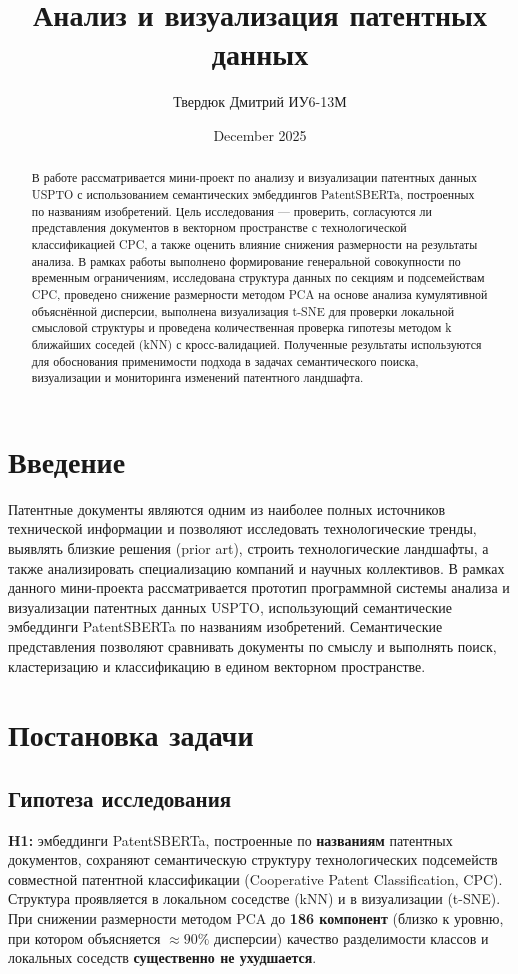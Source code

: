 \documentclass{article}
\title{Анализ и визуализация патентных данных}
\author{Твердюк Дмитрий ИУ6-13М}
\date{December 2025}
\begin{document}
\maketitle

\begin{abstract}
В работе рассматривается мини-проект по анализу и визуализации патентных данных USPTO с использованием семантических эмбеддингов PatentSBERTa, построенных по названиям изобретений. Цель исследования --- проверить, согласуются ли представления документов в векторном пространстве с технологической классификацией CPC, а также оценить влияние снижения размерности на результаты анализа. В рамках работы выполнено формирование генеральной совокупности по временным ограничениям, исследована структура данных по секциям и подсемействам CPC, проведено снижение размерности методом PCA на основе анализа кумулятивной объяснённой дисперсии, выполнена визуализация t-SNE для проверки локальной смысловой структуры и проведена количественная проверка гипотезы методом k ближайших соседей (kNN) с кросс-валидацией. Полученные результаты используются для обоснования применимости подхода в задачах семантического поиска, визуализации и мониторинга изменений патентного ландшафта.
\end{abstract}

\tableofcontents
\newpage

\section{Введение}
Патентные документы являются одним из наиболее полных источников технической информации и позволяют исследовать технологические тренды, выявлять близкие решения (prior art), строить технологические ландшафты, а также анализировать специализацию компаний и научных коллективов.
В рамках данного мини-проекта рассматривается прототип программной системы анализа и визуализации патентных данных USPTO, использующий семантические эмбеддинги PatentSBERTa по названиям изобретений. Семантические представления позволяют сравнивать документы по смыслу и выполнять поиск, кластеризацию и классификацию в едином векторном пространстве.

\section{Постановка задачи}
\subsection{Гипотеза исследования}
\textbf{H1:} эмбеддинги PatentSBERTa, построенные по \textbf{названиям} патентных документов, сохраняют семантическую структуру технологических подсемейств совместной патентной классификации (Cooperative Patent Classification, CPC). 
Структура проявляется в локальном соседстве (kNN) и в визуализации (t-SNE). 
При снижении размерности методом PCA до \textbf{186 компонент} (близко к уровню, при котором объясняется $\approx 90\%$ дисперсии) качество разделимости классов и локальных соседств \textbf{существенно не ухудшается}.
\end{document}
